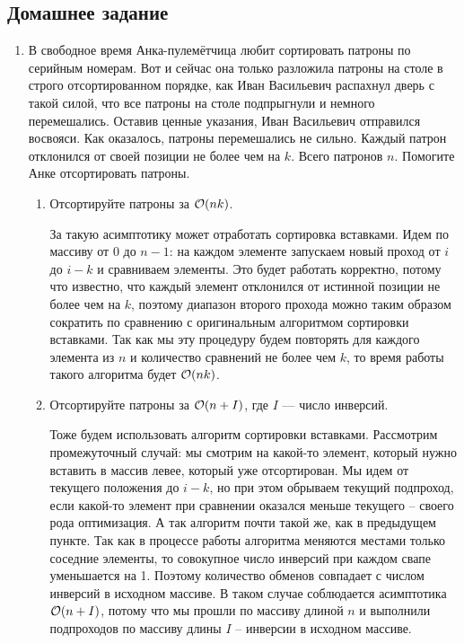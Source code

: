\subsection{Домашнее задание}
\begin{enumerate}
 \item
  В свободное время Анка-пулемётчица любит сортировать патроны по
  серийным номерам. Вот и сейчас она только разложила патроны на
  столе в строго отсортированном порядке, как Иван Васильевич
  распахнул дверь с такой силой, что все патроны на столе подпрыгнули
  и немного перемешались. Оставив ценные указания, Иван Васильевич
  отправился восвояси.  Как оказалось, патроны перемешались не
  сильно. Каждый патрон отклонился от своей позиции не более чем на
  $k$. Всего патронов $n$. Помогите Анке отсортировать
  патроны.

  \begin{enumerate}
     \item Отсортируйте патроны за $\mathcal{O}(nk)$.
     \begin{solution}
      За такую асимптотику может отработать сортировка вставками. Идем по массиву от 0 до $n-1$: на каждом элементе запускаем новый проход от $i$ до $i-k$ и сравниваем элементы. Это будет работать корректно, потому что известно, что каждый элемент отклонился от истинной позиции не более чем на $k$, поэтому диапазон второго прохода можно таким образом сократить по сравнению с оригинальным алгоритмом сортировки вставками. Так как мы эту процедуру будем повторять для каждого элемента из $n$ и количество сравнений не более чем $k$, то время работы такого алгоритма будет $\mathcal{O}(nk)$.
     \end{solution}
     \item Отсортируйте патроны за $\mathcal{O}(n + I)$, 
      где $I$ --- число инверсий.
     \begin{solution}
      Тоже будем использовать алгоритм сортировки вставками. Рассмотрим промежуточный случай: мы смотрим на какой-то элемент, который нужно вставить в массив левее, который уже отсортирован. Мы идем от текущего положения до $i-k$, но при этом обрываем текущий подпроход, если какой-то элемент при сравнении оказался меньше текущего -- своего рода оптимизация. А так алгоритм почти такой же, как в предыдущем пункте. Так как в процессе работы алгоритма меняются местами только соседние элементы, то совокупное число инверсий при каждом свапе уменьшается на 1. Поэтому количество обменов совпадает с числом инверсий в исходном массиве. В таком случае соблюдается асимптотика $\mathcal{O}(n + I)$, потому что мы прошли по массиву длиной $n$ и выполнили подпроходов по массиву длины $I$ -- инверсии в исходном массиве.

\end{solution}
\end{enumerate}
\end{enumerate}
